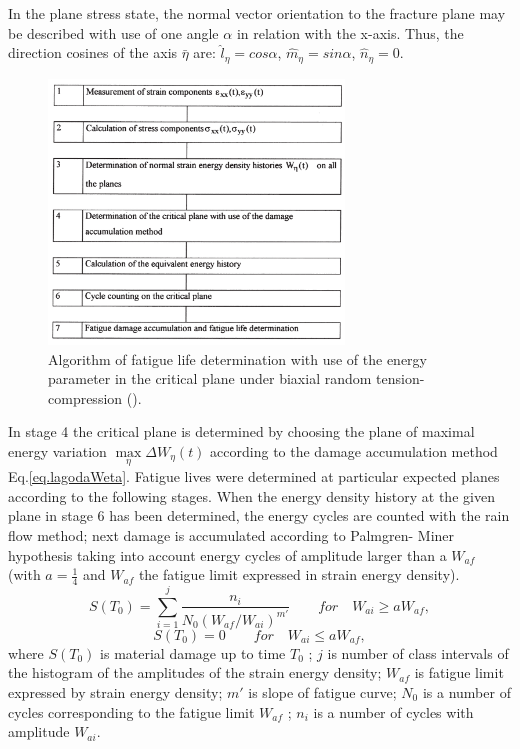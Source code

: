 In the plane stress state, the normal vector orientation
to the fracture plane may be described with use of one
angle $\alpha$ in relation with the x-axis. Thus, the direction
cosines of the axis $\bar{\eta}$ are:
$\hat{l}_\eta=cos\alpha$, $\hat{m}_\eta=sin\alpha$, $\hat{n}_\eta=0$.
\begin{figure}[h!]
	\centering
	\includegraphics[width=0.7\textwidth]{figures//algorithm.png} 
	\caption{Algorithm of fatigue life determination with use of the energy parameter in the critical plane under biaxial random tension-compression (\cite{lagoda1999critical}).}
	\label{fig.algorithm}
\end{figure}
In stage 4 the critical plane is determined by choosing the plane of maximal energy variation $\max \limits_{\eta}\Delta W_{\eta}(t)$ according to
the damage accumulation method Eq.\eqref{eq.lagodaWeta}. Fatigue lives
were determined at particular expected planes according
to the following stages. When the energy density history
at the given plane in stage 6 has been determined, the
energy cycles are counted with the rain flow method;
next damage is accumulated according to Palmgren-
Miner hypothesis taking into account energy
cycles of amplitude larger than a $W_{af}$ (with $a=\frac{1}{4}$ and $W_{af}$ the fatigue limit expressed in strain energy density).
$$S(T_0)=\sum_{i=1}^{j}\dfrac{n_i}{N_0(W_{af}/W_{ai})^{m'}} \qquad for \quad W_{ai} \geqslant aW_{af},$$
$$S(T_0)=0 \qquad for \quad W_{ai} \leqslant aW_{af},$$
where $S(T_0)$ is material damage up to time $T_0$ ; $j$ is number of class intervals of the histogram of the amplitudes
of the strain energy density; $W_{af}$ is fatigue limit
expressed by strain energy density;  $m'$ is slope of fatigue curve; $N_0$ is a number of cycles corresponding to the fatigue
limit $W_{af}$ ; $n_i$ is a number of cycles with amplitude $W_{ai}$.

